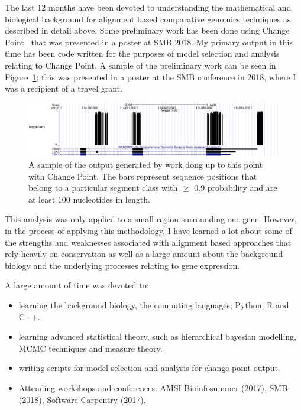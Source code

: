 
The last 12 months have been devoted to understanding the mathematical and biological background for alignment based comparative genomics techniques as described in detail above. Some preliminary work has been done using Change Point~\cite{keith2006segmenting} that was presented in a poster at SMB 2018. My primary output in this time has been code written for the purposes of model selection and analysis relating to Change Point. A sample of the preliminary work can be seen in Figure~\ref{fig:wigglel}; this was presented in a poster at the SMB conference in 2018, where I was a recipient of a travel grant.

\begin{figure}[H]
    \centering
    \includegraphics[width = \textwidth]{WiggleTrack1.pdf}
    \caption{A sample of the output generated by work dong up to this point with Change Point. The bars represent sequence positions that belong to a particular segment class with $\geq$ 0.9 probability and are at least 100 nucleotides in length.}
    \label{fig:wigglel}
\end{figure}

This analysis was only applied to a small region surrounding one gene. However, in the process of applying this methodology, I have learned a lot about some of the strengths and weaknesses associated with alignment based approaches that rely heavily on conservation as well as a large amount about the background biology and the underlying processes relating to gene expression. 

A large amount of time was devoted to:
  \begin{itemize}
        \item learning the background biology, the computing languages; Python, R and C++.
        \item learning advanced statistical theory, such as hierarchical bayesian modelling, MCMC techniques and measure theory.
        \item writing scripts for model selection and analysis for change point output.
        \item Attending workshops and conferences: AMSI Bioinfosummer (2017), SMB (2018), Software Carpentry (2017).
    \end{itemize}
    